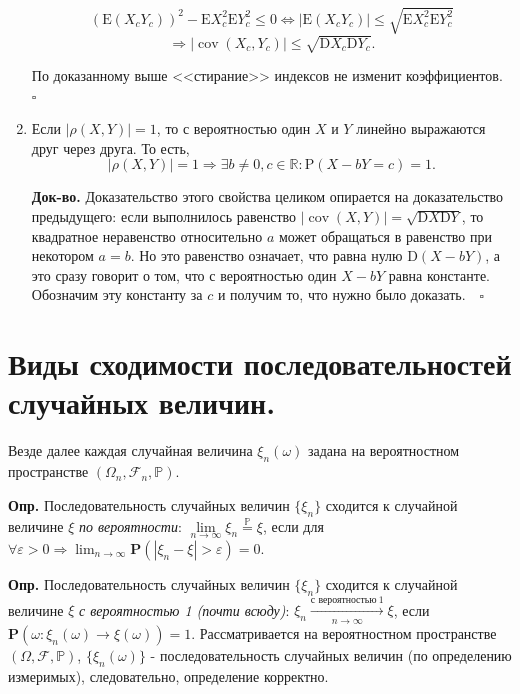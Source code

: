 \documentclass[oneside,final,14pt]{extreport}
\newcommand\mydef{{\bf Опр.}}
\newcommand\myqed{{\bf Док-во.}}
\theoremstyle{definition}
\begin{document}
\begin{enumerate}
    $$\left(\mathrm{E}\left(X_{c} Y_{c}\right)\right)^{2}-\mathrm{E} X_{c}^{2} \mathrm{E} Y_{c}^{2} \leqslant 0 \Longleftrightarrow\left|\mathrm{E}\left(X_{c} Y_{c}\right)\right| \leqslant \sqrt{\mathrm{E} X_{c}^{2} \mathrm{E} Y_{c}^{2}} $$$$\Rightarrow\left|\operatorname{cov}\left(X_{c}, Y_{c}\right)\right| \leqslant \sqrt{\mathrm{D} X_{c} \mathrm{D} Y_{c}}.$$
    
    По доказанному выше <<стирание>> индексов не изменит коэффициентов. $\square$

    \item Если $|\rho(X,Y)| = 1$, то с вероятностью один $X$ и $Y$ линейно выражаются друг через друга. То есть,
    $$|\rho(X, Y)|=1 \Longrightarrow \exists b \neq 0, c \in \mathbb{R}: \mathrm{P}(X-b Y=c)=1.$$
    
    \myqed{} Доказательство этого свойства целиком опирается на доказательство предыдущего: если выполнилось равенство $|\operatorname{cov}(X, Y)|=\sqrt{\mathrm{D} X \mathrm{D} Y}$, то квадратное неравенство относительно $a$ может обращаться в равенство при некотором $a = b$. Но это равенство означает, что равна нулю $\mathrm{D}(X-b Y)$, а это сразу говорит о том, что с вероятностью один $X - bY$ равна константе. Обозначим эту константу за $c$ и получим то, что нужно было доказать. $~~~\square$

\end{enumerate}

\section{Виды сходимости последовательностей случайных величин.}

Везде далее каждая случайная величина $\xi_n(\omega)$ задана на вероятностном пространстве $(\Omega_n,\mathcal{F}_n,\mathbb{P})$.

\mydef{} Последовательность случайных величин $\{ \xi_n \}$ сходится к случайной величине $\xi$ {\it по вероятности}: $\lim\limits_{n \rightarrow \infty} \xi_{n} \overset{\mathbb{P}}{=} \xi$, если для $\forall \varepsilon > 0 \Rightarrow \lim _{n \rightarrow \infty} \mathbf{P}\left(\left|\xi_{n}-\xi\right|>\varepsilon\right)=0.$

\mydef{} Последовательность случайных величин $\{ \xi_n \}$ сходится к случайной величине $\xi$ {\it с вероятностью 1 (почти всюду)}: $\xi_n \xrightarrow[n \rightarrow \infty]{\text{с вероятностью}~1} \xi$, если $\mathbf{P}\left(\omega: \xi_{n}(\omega) \rightarrow \xi(\omega)\right)=1$. Рассматривается на вероятностном пространстве $(\Omega, \mathcal{F}, \mathbb{P})$, $\{ \xi_n(\omega) \}$ - последовательность случайных величин (по определению измеримых), следовательно, определение корректно.
\end{document}
